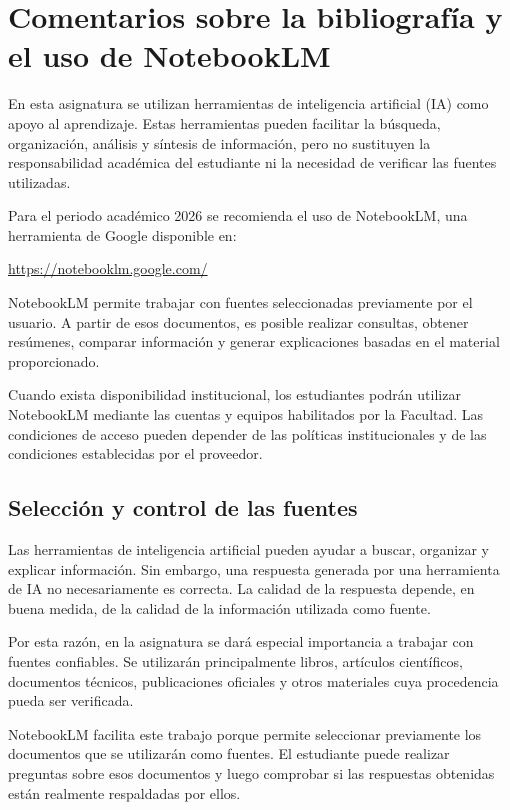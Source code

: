 \documentclass[12pt,a4paper]{article}
\begin{document}
\section{Comentarios sobre la bibliografía y el uso de NotebookLM}

En esta asignatura se utilizan herramientas de inteligencia artificial (IA) como apoyo al aprendizaje. Estas herramientas pueden facilitar la búsqueda, organización, análisis y síntesis de información, pero no sustituyen la responsabilidad académica del estudiante ni la necesidad de verificar las fuentes utilizadas.

Para el periodo académico 2026 se recomienda el uso de NotebookLM, una herramienta de Google disponible en:\parencite{googleNotebookLM}

\begin{center}
\url{https://notebooklm.google.com/}
\end{center}

NotebookLM permite trabajar con fuentes seleccionadas previamente por el usuario. A partir de esos documentos, es posible realizar consultas, obtener resúmenes, comparar información y generar explicaciones basadas en el material proporcionado.\parencite{googleNotebookLM}

Cuando exista disponibilidad institucional, los estudiantes podrán utilizar NotebookLM mediante las cuentas y equipos habilitados por la Facultad. Las condiciones de acceso pueden depender de las políticas institucionales y de las condiciones establecidas por el proveedor.

\subsection{Selección y control de las fuentes}

Las herramientas de inteligencia artificial pueden ayudar a buscar, organizar y explicar información. Sin embargo, una respuesta generada por una herramienta de IA no necesariamente es correcta. La calidad de la respuesta depende, en buena medida, de la calidad de la información utilizada como fuente.

Por esta razón, en la asignatura se dará especial importancia a trabajar con fuentes confiables. Se utilizarán principalmente libros, artículos científicos, documentos técnicos, publicaciones oficiales y otros materiales cuya procedencia pueda ser verificada.

NotebookLM facilita este trabajo porque permite seleccionar previamente los documentos que se utilizarán como fuentes. El estudiante puede realizar preguntas sobre esos documentos y luego comprobar si las respuestas obtenidas están realmente respaldadas por ellos.\parencite{googleNotebookLM}
\end{document}
